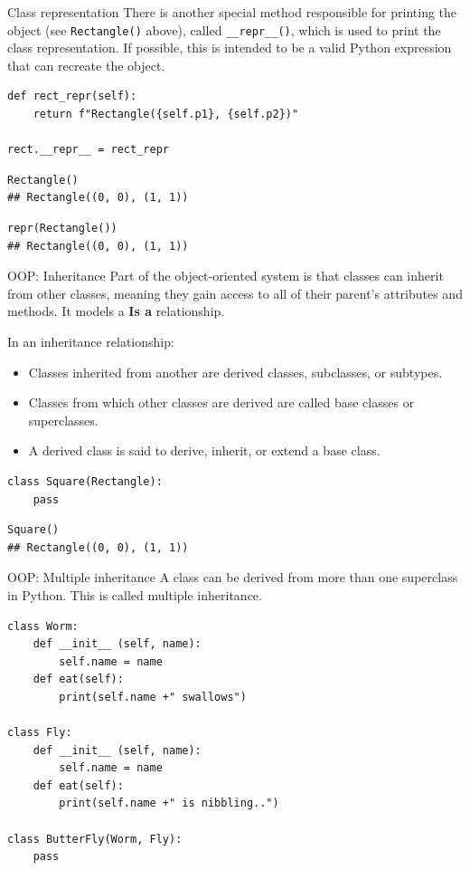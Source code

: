 \documentclass[10pt]{beamer}
\begin{document}
\begin{frame}[fragile]{Class representation}
There is another special method responsible for printing the object (see \texttt{Rectangle()} above), called \texttt{\_\_repr\_\_()}, which is used to print the class representation. If possible, this is intended to be a valid Python expression that can recreate the object.
\begin{lstlisting}[style=mypython]
def rect_repr(self):
	return f"Rectangle({self.p1}, {self.p2})"

rect.__repr__ = rect_repr
\end{lstlisting}

\begin{lstlisting}[style=mypython]
Rectangle()
## Rectangle((0, 0), (1, 1))
\end{lstlisting}

\begin{lstlisting}[style=mypython]
repr(Rectangle())
## Rectangle((0, 0), (1, 1))
\end{lstlisting}
\end{frame}
\begin{frame}[fragile]{OOP:  Inheritance}
Part of the object-oriented system is that classes can inherit from other classes, meaning they gain access to all of their parent's attributes and methods. It models a \textbf{Is a} relationship.

In an inheritance relationship:

\begin{itemize}
\item Classes inherited from another are derived classes, subclasses, or subtypes.
\item Classes from which other classes are derived are called base classes or superclasses.
\item A derived class is said to derive, inherit, or extend a base class.
\end{itemize}
\begin{lstlisting}[style=mypython]
class Square(Rectangle): 
	pass 
\end{lstlisting}
\begin{lstlisting}[style=mypython]
Square()
## Rectangle((0, 0), (1, 1))
\end{lstlisting}
\end{frame}

\begin{frame}[fragile]{OOP: Multiple inheritance}
A class can be derived from more than one superclass in Python. This is called multiple inheritance.
\begin{lstlisting}[style=mypython]
class Worm:
	def __init__ (self, name): 
		self.name = name
	def eat(self): 
		print(self.name +" swallows")

class Fly:
	def __init__ (self, name): 
		self.name = name
	def eat(self): 
		print(self.name +" is nibbling..")

class ButterFly(Worm, Fly): 
	pass
\end{lstlisting}


\end{frame}
\end{document}
